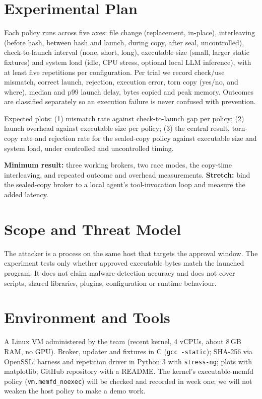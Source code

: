 \documentclass[11pt,a4paper]{article}
\begin{document}
\section{Experimental Plan}
Each policy runs across five axes: file change (replacement, in-place), interleaving (before hash, between hash and launch, during copy, after seal, uncontrolled), check-to-launch interval (none, short, long), executable size (small, larger static fixtures) and system load (idle, CPU stress, optional local LLM inference), with at least five repetitions per configuration. Per trial we record check/use mismatch, correct launch, rejection, execution error, torn copy (yes/no, and where), median and p99 launch delay, bytes copied and peak memory. Outcomes are classified separately so an execution failure is never confused with prevention.

Expected plots: (1) mismatch rate against check-to-launch gap per policy; (2) launch overhead against executable size per policy; (3) the central result, torn-copy rate and rejection rate for the sealed-copy policy against executable size and system load, under controlled and uncontrolled timing.

\textbf{Minimum result:} three working brokers, two race modes, the copy-time interleaving, and repeated outcome and overhead measurements. \textbf{Stretch:} bind the sealed-copy broker to a local agent's tool-invocation loop and measure the added latency.

\section{Scope and Threat Model}
The attacker is a process on the same host that targets the approval window. The experiment tests only whether approved executable bytes match the launched program. It does not claim malware-detection accuracy and does not cover scripts, shared libraries, plugins, configuration or runtime behaviour.

\section{Environment and Tools}
A Linux VM administered by the team (recent kernel, 4 vCPUs, about 8\,GB RAM, no GPU). Broker, updater and fixtures in C (\texttt{gcc -static}); SHA-256 via OpenSSL; harness and repetition driver in Python 3 with \texttt{stress-ng}; plots with matplotlib; GitHub repository with a README. The kernel's executable-memfd policy (\texttt{vm.memfd\_noexec}) will be checked and recorded in week one; we will not weaken the host policy to make a demo work.
\end{document}
